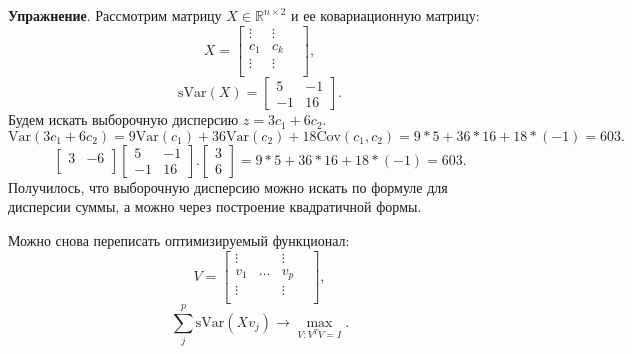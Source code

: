 \documentclass[12pt]{article} %
\theoremstyle{definition} %
\begin{document}
\textbf{Упражнение}. Рассмотрим матрицу $X \in \mathbb{R}^{n \times 2}$ и ее ковариационную матрицу:
$$
X = \begin{bmatrix} 
    \vdots & \vdots & \\
    c_1 &  c_k \\
    \vdots &   \vdots & \\
    \end{bmatrix},
$$
$$
\text{sVar}(X) = 
\begin{bmatrix}
5 & -1 \\
-1 & 16
\end{bmatrix}.
$$
Будем искать выборочную дисперсию $z = 3c_1 + 6c_2$.
$$\text{Var}(3c_1+6c_2)=9\text{Var}(c_1) + 36 \text{Var}(c_2) + 18 \text{Cov}(c_1, c_2) = 9 * 5 + 36 * 16 + 18 * (-1) = 603.$$
$$
\begin{bmatrix}
3 & -6 \\
\end{bmatrix}
\begin{bmatrix}
5 & -1 \\
-1 & 16
\end{bmatrix}.
\begin{bmatrix}
3\\
6
\end{bmatrix}=9 * 5 + 36 * 16 + 18 * (-1) = 603.
$$
Получилось, что выборочную дисперсию можно искать по формуле для дисперсии суммы, а можно через построение квадратичной формы.

Можно снова переписать оптимизируемый функционал:
$$
V = \begin{bmatrix} 
    \vdots & & \vdots & \\
    v_1 & \dots &v_p \\
    \vdots & & \vdots & \\
    \end{bmatrix},
$$
$$\sum_{j}^p \text{sVar}(Xv_j) \to \max_{V: V^TV=I}.$$
\end{document}
